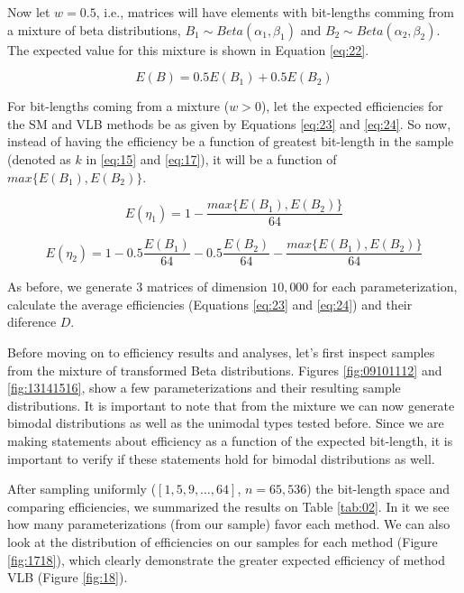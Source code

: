 \documentclass[10pt]{article}
\begin{document}
Now let $w = 0.5$, i.e., matrices will have elements with bit-lengths comming from a mixture of beta distributions, $B_1\sim Beta(\alpha_1,\beta_1)$ and $B_2\sim Beta(\alpha_2,\beta_2)$. The expected value for this mixture is shown in Equation \ref{eq:22}.
 
\begin{equation}\label{eq:22}
 E(B) = 0.5 E(B_1) + 0.5 E(B_2)
\end{equation}
 
For bit-lengths coming from a mixture ($w>0$), let the expected efficiencies for the SM and VLB methods be as given by Equations \ref{eq:23} and \ref{eq:24}. So now, instead of having the efficiency be a function of greatest bit-length in the sample (denoted as  $k$ in \ref{eq:15} and \ref{eq:17}), it will be a function of $max\{E(B_1),E(B_2)\}$.

\begin{equation}\label{eq:23}
 E(\eta_1) = 1 - \frac{max\{E(B_1),E(B_2)\}}{64}
\end{equation}

\begin{equation}\label{eq:24}
 E(\eta_2) = 1 - 0.5\frac{E(B_1)}{64} - 0.5\frac{E(B_2)}{64} - \frac{max\{E(B_1),E(B_2)\}}{64}
\end{equation}
 
As before, we generate 3 matrices of dimension $10,000$ for each parameterization, calculate the average efficiencies (Equations \ref{eq:23} and \ref{eq:24}) and their diference $D$.

Before moving on to efficiency results and analyses, let's first inspect samples from the mixture of transformed Beta distributions. Figures \ref{fig:09101112} and \ref{fig:13141516}, show a few parameterizations and their resulting sample distributions. It is important to note that from the mixture we can now generate bimodal distributions as well as the unimodal types tested before. Since we are making statements about efficiency as a function of the expected bit-length, it is important to verify if these statements hold for bimodal  distributions as well.

After sampling uniformly ($[1,5,9,\ldots,64]$, $n=65,536$) the bit-length space and comparing efficiencies, we summarized the results on Table \ref{tab:02}. In it we see how many parameterizations (from our sample) favor each method. We can also look at the distribution of efficiencies on our samples for each method (Figure \ref{fig:1718}), which clearly demonstrate the greater expected efficiency of method VLB (Figure \ref{fig:18}).
\end{document}
